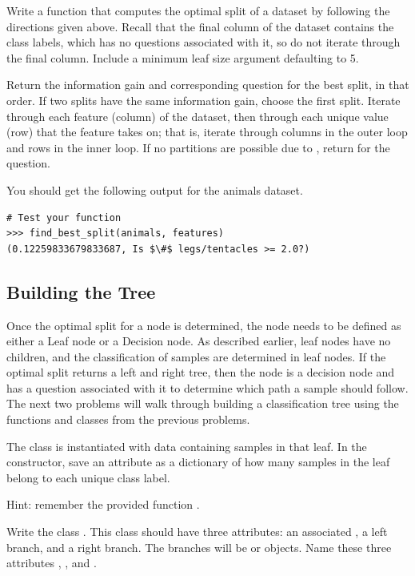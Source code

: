 \begin{problem}
Write a function  that computes the optimal split of a dataset by following the directions given above.
Recall that the final column of the dataset contains the class labels, which has no questions associated with it, so do not iterate through the final column.
Include a minimum leaf size argument  defaulting to 5.

Return the information gain and corresponding question for the best split, in that order.
If two splits have the same information gain, choose the first split.
Iterate through each feature (column) of the dataset, then through each unique value (row) that the feature takes on; that is, iterate through columns in the outer loop and rows in the inner loop.
If no partitions are possible due to , return  for the question.

\noindent You should get the following output for the animals dataset.
\begin{lstlisting}[mathescape=true]
# Test your function
>>> find_best_split(animals, features)
(0.12259833679833687, Is $\#$ legs/tentacles >= 2.0?)
\end{lstlisting}
\end{problem}

\subsection*{Building the Tree}
Once the optimal split for a node is determined, the node needs to be defined as either a Leaf node or a Decision node. 
As described earlier, leaf nodes have no children, and the classification of samples are determined in leaf nodes.
If the optimal split returns a left and right tree, then the node is a decision node and has a question associated with it to determine which path a sample should follow.
The next two problems will walk through building a classification tree using the functions and classes from the previous problems.

\begin{problem}
The class  is instantiated with data containing samples in that leaf. 
In the constructor, save an attribute  as a dictionary of how many samples in the leaf belong to each unique class label.

\noindent Hint: remember the provided function .

Write the class .
This class should have three attributes: an associated , a left branch, and a right branch.
The branches will be  or  objects.
Name these three attributes , , and .
\end{problem}

